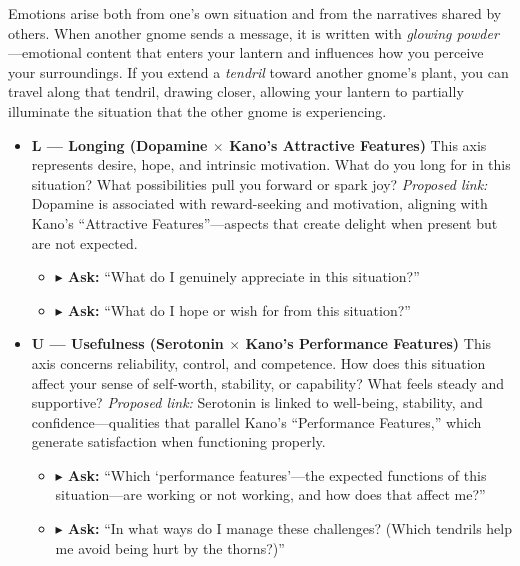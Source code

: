 \documentclass{article}
\begin{document}
Emotions arise both from one’s own situation and from the narratives shared by others. When another gnome sends a message, it is written with \textit{glowing powder}—emotional content that enters your lantern and influences how you perceive your surroundings.  
If you extend a \textit{tendril} toward another gnome’s plant, you can travel along that tendril, drawing closer, allowing your lantern to partially illuminate the situation that the other gnome is experiencing.

\begin{center}
\end{center}

\begin{itemize}[noitemsep,topsep=0pt]

    \item \textbf{L — Longing (Dopamine $\times$ Kano’s Attractive Features)}  
    This axis represents desire, hope, and intrinsic motivation. What do you long for in this situation? What possibilities pull you forward or spark joy?  
    \textit{Proposed link:} Dopamine is associated with reward-seeking and motivation, aligning with Kano’s “Attractive Features”—aspects that create delight when present but are not expected.  
    \begin{itemize}[noitemsep,topsep=0pt]
        \item \textbf{$\blacktriangleright$ Ask:} “What do I genuinely appreciate in this situation?”  
        \item \textbf{$\blacktriangleright$ Ask:} “What do I hope or wish for from this situation?”  
    \end{itemize}

    \item \textbf{U — Usefulness (Serotonin $\times$ Kano’s Performance Features)}  
    This axis concerns reliability, control, and competence. How does this situation affect your sense of self-worth, stability, or capability? What feels steady and supportive?  
    \textit{Proposed link:} Serotonin is linked to well-being, stability, and confidence—qualities that parallel Kano’s “Performance Features,” which generate satisfaction when functioning properly.  
    \begin{itemize}[noitemsep,topsep=0pt]
        \item \textbf{$\blacktriangleright$ Ask:} “Which ‘performance features’—the expected functions of this situation—are working or not working, and how does that affect me?”  
        \item \textbf{$\blacktriangleright$ Ask:} “In what ways do I manage these challenges? (Which tendrils help me avoid being hurt by the thorns?)”  
    \end{itemize}


\end{itemize}
\end{document}
